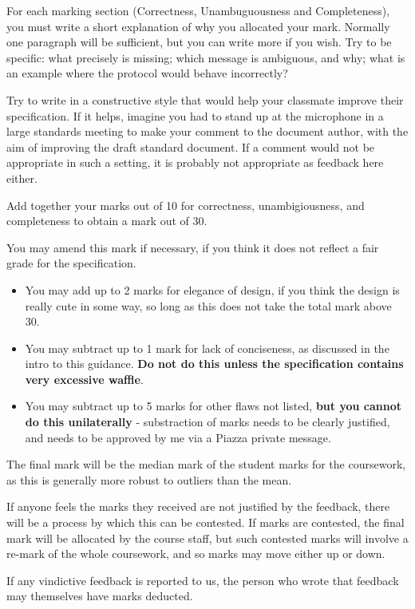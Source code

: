 \documentclass{article}
\begin{document}
For each marking section (Correctness, Unambuguousness and
Completeness), you must write a short explanation of why you allocated
your mark.  Normally one paragraph will be sufficient, but you can
write more if you wish.  Try to be specific: what precisely is
missing; which message is ambiguous, and why; what is an example where
the protocol would behave incorrectly?

Try to write in a constructive style that would help your classmate
improve their specification.  If it helps, imagine you had to stand up
at the microphone in a large standards meeting to make your comment to
the document author, with the aim of improving the draft standard
document.  If a comment would not be appropriate in such a setting, it
is probably not appropriate as feedback here either.

Add together your marks out of 10 for correctness, unambigiousness,
and completeness to obtain a mark out of 30.

You may amend this mark if necessary, if you think it does not reflect
a fair grade for the specification.
\begin{itemize}
\item You may add up to 2 marks for
elegance of design, if you think the design is really cute in some
way, so long as this does not take the total mark above 30.
\item You may subtract up to 1 mark for lack of conciseness, as
  discussed in the intro to this guidance.  \textbf{Do not do this unless the
  specification contains very excessive waffle}.
\item You may subtract up to 5 marks for other flaws not listed, \textbf{but
you cannot do this unilaterally} - substraction of marks needs to be
clearly justified, and needs to be approved by me via a Piazza private
message. 
\end{itemize}

The final mark will be the median mark of the student marks for the
coursework, as this is generally more robust to outliers than the
mean.

If anyone feels the marks they received are not justified by the
feedback, there will be a process by which this can be contested.  If
marks are contested, the final mark will be allocated by the course
staff, but such contested marks will involve a re-mark of the whole
coursework, and so marks may move either up or down.

If any vindictive feedback is reported to us, the person who wrote
that feedback may themselves have marks deducted.
\end{document}
